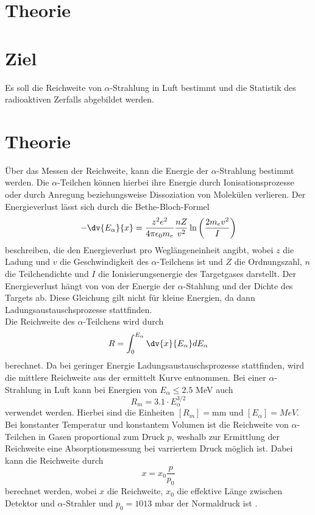 \section{Theorie}
\label{sec:Theorie}

\section{Ziel}
Es soll die Reichweite von $\alpha$-Strahlung in Luft bestimmt und die Statistik des radioaktiven Zerfalls abgebildet werden. 

\section{Theorie}
Über das Messen der Reichweite, kann die Energie der $\alpha$-Strahlung bestimmt werden. Die $\alpha$-Teilchen können hierbei ihre Energie durch Ionisationsprozesse oder durch Anregung beziehungsweise Dissoziation von Molekülen verlieren. Der Energieverlust lässt sich durch die Bethe-Bloch-Formel
\begin{equation}
  -\dv{E_{\alpha}}{x}=\frac{z^2 e^2}{4\pi\epsilon_0 m_e}\frac{nZ}{v^2}\ln{\left(\frac{2m_e v^2}{I}\right)}
  \label{eq:1}
\end{equation}
beschreiben, die den Energieverlust pro Weglängeneinheit angibt, wobei $z$ die Ladung und $v$ die Geschwindigkeit des $\alpha$-Teilchens ist und $Z$ die Ordnungszahl, $n$ die Teilchendichte und $I$ die Ionisierungsenergie des Targetgases darstellt. Der Energieverlust hängt von von der Energie der $\alpha$-Stahlung und der Dichte des Targets ab. Diese Gleichung gilt nicht für kleine Energien, da dann Ladungsaustauschsprozesse stattfinden.\\
Die Reichweite des $\alpha$-Teilchens wird durch
\begin{equation}
  R=\int_{0}^{E_{\alpha}} \dv{x}{E_{\alpha}} dE_{\alpha}
  \label{eq:2}
\end{equation}
berechnet. Da bei geringer Energie Ladungsaustauschsprozesse stattfinden, wird die mittlere Reichweite aus der ermittelt Kurve entnommen. Bei einer $\alpha$-Strahlung in Luft kann bei Energien von $E_\alpha \leq 2.5$ MeV auch 
\begin{equation}
  R_m=3.1\cdot E_\alpha^{3/2}
  \label{eq:3}
\end{equation}
verwendet werden. Hierbei sind die Einheiten $[R_m]=\textrm{mm}$ und $[E_\alpha]=MeV$.\\
Bei konstanter Temperatur und konstantem Volumen ist die Reichweite von $\alpha$-Teilchen in Gasen proportional zum Druck $p$, weshalb zur Ermittlung der Reichweite eine Absorptionsmessung bei varriertem Druck möglich ist. Dabei kann die Reichweite durch
\begin{equation}
  x=x_0 \frac{p}{p_0}
  \label{eq:4}
\end{equation}
berechnet werden, wobei $x$ die Reichweite, $x_0$ die effektive Länge zwischen Detektor und $\alpha$-Strahler und $p_0=1013$ mbar der Normaldruck ist \cite{1}.

